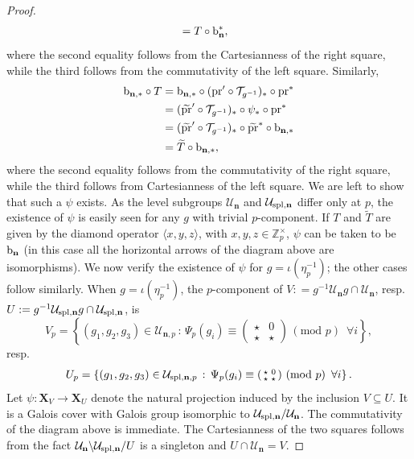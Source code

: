 \documentclass{amsart}
\numberwithin{equation}{section}
\newcommand{\ZZ}{\mathbb{Z}}
\begin{document}
\begin{proof}
\begin{align*}
        & = T \circ {\rm b}_{\mathbf{n}}^* ,
    \end{align*}
    where the second equality follows from the Cartesianness of the right square, while the third follows from the commutativity of the left square. Similarly, 
  \begin{align*}
        {\rm b}_{\mathbf{n},\ast} \circ T & =    {\rm b}_{\mathbf{n},\ast} \circ ({\rm pr}' \circ \mathcal{T}_{g^{-1}})_* \circ {\rm pr}^* \\ &=   (\widetilde{\rm pr}' \circ \mathcal{T}_{g^{-1}})_* \circ \psi_* \circ {\rm pr}^* \\
        &=  (\widetilde{\rm pr}' \circ \mathcal{T}_{g^{-1}})_* \circ \widetilde{\rm pr}^* \circ {\rm b}_{\mathbf{n},\ast} \\ 
        & = \widetilde{T} \circ {\rm b}_{\mathbf{n},\ast} ,
    \end{align*}
where the second equality follows from the commutativity of the right square, while the third follows from Cartesianness of the left square.
We are left to show that such a $\psi$ exists. As the level subgroups $\mathcal{U}_{\mathbf{n}}$ and $\mathcal{U}_{{\rm spl},\mathbf{n}}$ differ only at $p$, the existence of $\psi$ is easily seen for any $g$ with trivial $p$-component. If $T$ and $\tilde{T}$ are given by the diamond operator $ \langle x, y, z \rangle$, with $x,y,z \in \ZZ_p^\times$, $\psi$ can be taken to be ${\rm b}_{\mathbf{n}}$ (in this case all the horizontal arrows of the diagram above are isomorphisms). We now verify the existence of $\psi$ for $g = \iota(\eta_p^{-1})$; the other cases follow similarly. When $g = \iota(\eta_p^{-1})$, the $p$-component of $V: = g^{-1}\mathcal{U}_{\mathbf{n}} g \cap \mathcal{U}_{\mathbf{n}}$, resp. $U: = g^{-1}\mathcal{U}_{{\rm spl},\mathbf{n}} g \cap \mathcal{U}_{{\rm spl},\mathbf{n}}$, is \[ V_p = \left \{ (g_1,g_2,g_3) \in \mathcal{U}_{\mathbf{n},p} \,:\, \Psi_p(g_i) \equiv \left( \begin{smallmatrix} \star &  0 \\ \star & \star \end{smallmatrix}\right)\, (\text{mod } p) \, \,\, \forall i \right \}, \]
resp. \[ U_p = \left \{ (g_1,g_2,g_3) \in \mathcal{U}_{{\rm spl},\mathbf{n},p} \,:\, \Psi_p(g_i) \equiv \left( \begin{smallmatrix} \star &  0 \\ \star & \star \end{smallmatrix}\right)\, (\text{mod } p) \, \,\, \forall i\right \}. \]
Let $\psi : \mathbf{X}_V \to \mathbf{X}_U$ denote the natural projection induced by the inclusion $V \subseteq U$. It is a Galois cover with Galois group isomorphic to $\mathcal{U}_{{\rm spl},\mathbf{n}} / \mathcal{U}_{\mathbf{n}}$. The commutativity of the diagram above is immediate. The Cartesianness of the two squares follows from the fact $ \mathcal{U}_{\mathbf{n}} \backslash \mathcal{U}_{{\rm spl},\mathbf{n}} / U  $ is a singleton and $U \cap \mathcal{U}_{\mathbf{n}} = V$. 
 \end{proof}
\end{document}
